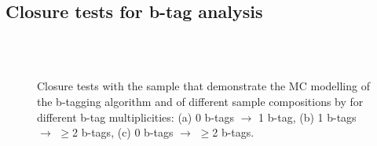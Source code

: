 
\newpage
\subsection{Closure tests for b-tag analysis}

\begin{figure}[!h]
  \begin{center}
     \\
     \\
    \caption{Closure tests with the \mj sample that demonstrate the MC
      modelling of the b-tagging algorithm and of different sample
      compositions by for different b-tag multiplicities: (a) 0 b-tags
      $\rightarrow$ 1 b-tag, (b) 1 b-tags $\rightarrow$ $\geq$2
      b-tags, (c) 0 b-tags $\rightarrow$ $\geq$2 b-tags.}
  \label{fig:btag-multi-closure}
  \end{center}
\end{figure}

